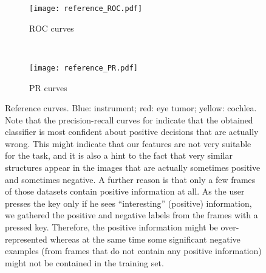 \begin{figure}[ht]
	\centering
	\begin{subfigure}[h]{0.45\textwidth}
	\texttt{[image: reference\_ROC.pdf]}	
		\caption*{ROC curves}
	\end{subfigure}
	~
	\begin{subfigure}[h]{0.45\textwidth}
	\texttt{[image: reference\_PR.pdf]}	
		\caption*{PR curves}
	\end{subfigure}
	\caption{Reference curves. Blue: instrument; red: eye tumor; yellow: cochlea. Note that the precision-recall curves for indicate that the obtained classifier is most confident about positive decisions that are actually wrong. This might indicate that our features are not very suitable for the task, and it is also a hint to the fact that very similar structures appear in the images that are actually sometimes positive and sometimes negative. A further reason is that only a few frames of those datasets contain positive information at all. As the user presses the key only if he sees ``interesting'' (positive) information, we gathered the positive and negative labels from the frames with a pressed key. Therefore, the positive information might be over-represented whereas at the same time some significant negative examples (from frames that do not contain any positive information) might not be contained in the training set.}
	\label{fig:reference-known-labels}
\end{figure}

